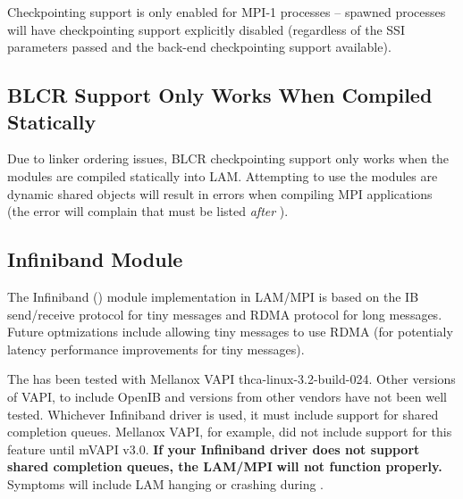 
Checkpointing support is only enabled for MPI-1 processes -- spawned
processes will have checkpointing support explicitly disabled
(regardless of the SSI parameters passed and the back-end
checkpointing support available).



\subsection{BLCR Support Only Works When Compiled Statically}


Due to linker ordering issues, BLCR checkpointing support only works
when the  modules are compiled statically into LAM.
Attempting to use the  modules are dynamic shared objects
will result in errors when compiling MPI applications (the error will
complain that  must be listed {\em after}
).



\subsection{Infiniband  Module}

The Infiniband () module implementation in LAM/MPI is based on
the IB send/receive protocol for tiny messages and RDMA protocol for
long messages.  Future optmizations include allowing tiny messages to
use RDMA (for potentialy latency performance improvements for tiny
messages).

The   has been tested with Mellanox VAPI
thca-linux-3.2-build-024.  Other versions of VAPI, to include OpenIB
and versions from other vendors have not been well tested.
%
%
Whichever Infiniband driver is used, it must include support for
shared completion queues.  Mellanox VAPI, for example, did not include
support for this feature until mVAPI v3.0.  {\bf If your Infiniband
  driver does not support shared completion queues, the LAM/MPI}
  {\bf will not function properly.}  Symptoms will
include LAM hanging or crashing during .
%

